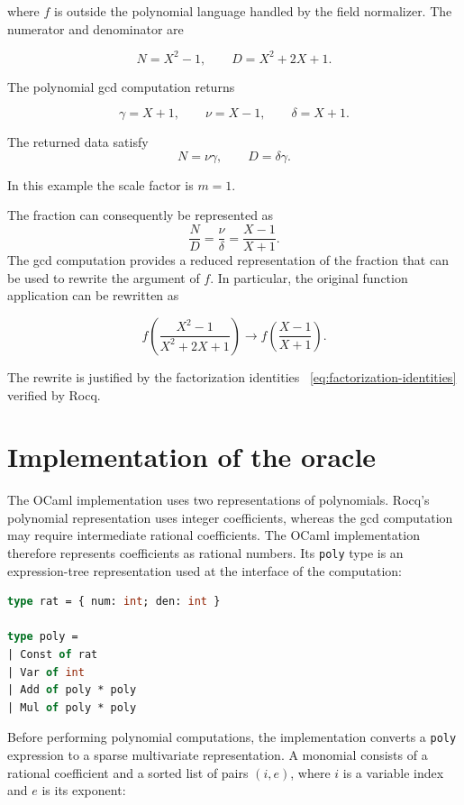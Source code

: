 \documentclass[11pt]{article}
\begin{document}
where \(f\) is outside the polynomial language handled by the field normalizer. 
The numerator and denominator are

$$
  N=X^2-1,\qquad D=X^2+2X+1.
$$

The polynomial gcd computation returns

$$
  \gamma=X+1,
  \qquad
  \nu=X-1,
  \qquad
  \delta=X+1.
$$

The returned data satisfy
\begin{equation}
  N=\nu\gamma,
  \qquad
  D=\delta\gamma.
  \label{eq:factorization-identities}
\end{equation}

In this example the scale factor is $m=1$.

The fraction can consequently be represented as
$$
  \frac{N}{D}
  =
  \frac{\nu}{\delta}
  =
  \frac{X-1}{X+1}.
$$
The gcd computation provides a reduced representation of the fraction that can be used to rewrite the argument of \(f\). In particular, the original function application can be rewritten as

$$
f\left(\frac{X^2-1}{X^2+2X+1}\right)
\longrightarrow
f\left(\frac{X-1}{X+1}\right).
$$

The rewrite is justified by the factorization identities ~\ref{eq:factorization-identities} verified by Rocq.

\section{Implementation of the oracle}
The OCaml implementation uses two representations of polynomials. Rocq's polynomial representation uses integer coefficients, whereas the gcd computation may require intermediate rational coefficients. The OCaml implementation therefore represents coefficients as rational numbers. Its \texttt{poly} type is an expression-tree representation used at the interface of the computation:
\begin{lstlisting}[language=ML]
type rat = { num: int; den: int }

type poly =
| Const of rat
| Var of int
| Add of poly * poly
| Mul of poly * poly
\end{lstlisting}

Before performing polynomial computations, the implementation converts a
\texttt{poly} expression to a sparse multivariate representation. A monomial
consists of a rational coefficient and a sorted list of pairs $(i,e)$, where
$i$ is a variable index and $e$ is its exponent:
\end{document}
